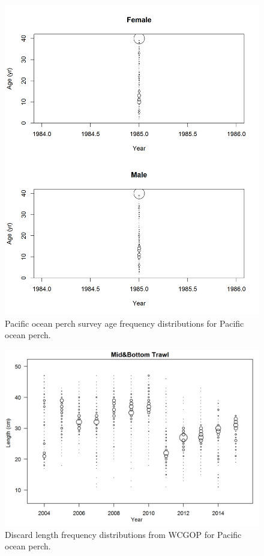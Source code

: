 \documentclass[12pt,]{article}
\begin{document}
\FloatBarrier

\begin{figure}
\centering
\includegraphics{Figures/POP_ages.png}
\caption{Pacific ocean perch survey age frequency distributions for
Pacific ocean perch. \label{fig:POP_Age}}
\end{figure}

\FloatBarrier

\begin{figure}
\centering
\includegraphics{Figures/discardLengthComps.png}
\caption{Discard length frequency distributions from WCGOP for Pacific
ocean perch. \label{fig:WCGOP_discard}}
\end{figure}
\end{document}
